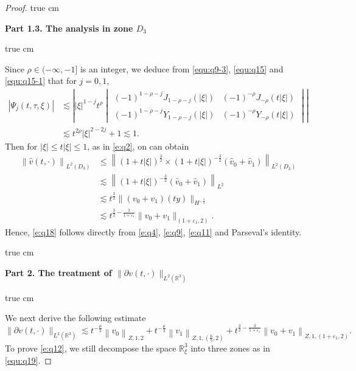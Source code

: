 \documentclass[10pt,a4paper]{amsart}
\newcommand{\R}{\mathbb R}
\newcommand{\f}{\frac}
\newcommand{\p}{\partial}
\begin{document}
\begin{proof}
 true cm

{\bf Part 1.3.  The analysis  in zone $D_3$}

 true cm

Since $\rho\in(-\infty,-1]$ is an integer, we deduce from \eqref{equ:q9-3}, \eqref{equ:q15} and \eqref{equ:q15-1} that for $j=0,1$,
\begin{equation}\label{e:q10}
\begin{aligned}
|\Psi_j(t,\tau,\xi)|
&\lesssim\left| |\xi|^{1-j} t^{\rho}
\begin{vmatrix}
(-1)^{1-\rho-j}J_{1-\rho-j}(|\xi|) & (-1)^{-\rho}J_{-\rho}(t|\xi|) \\
(-1)^{1-\rho-j}Y_{1-\rho-j}(|\xi|) & (-1)^{-\rho}Y_{-\rho}(t|\xi|)
\end{vmatrix} \right|\\
&\lesssim t^{2\rho}|\xi|^{2-2j}+1
\lesssim 1.
\end{aligned}
\end{equation}
Then for $|\xi|\leq t|\xi| \leq 1$, as in \eqref{e:q2}, on can obtain
\begin{equation}\label{e:q11}
\begin{aligned}
\left\|\hat{v}(t, \cdot)\right\|_{L^2(D_3)} & \leq\left\|(1+t|\xi|)^{\f32}\times(1+t|\xi|)^{-\f32}(\hat{v}_{0}+\hat{v}_{1})\right\|_{L^{2}(D_3)} \\
&\lesssim\left\|(1+t|\xi|)^{-\f32}(\hat{v}_{0}+\hat{v}_{1})\right\|_{L^{2}}\\
& \lesssim t^{\f32}\|(v_0+v_1)(ty)\|_{H^{-\f32}}\\
&\lesssim t^{\f32-\f{3}{1+\varepsilon_1}}\|v_0+v_1\|_{(1+\varepsilon_1, 2)}.
\end{aligned}
\end{equation}
Hence, \eqref{e:q18} follows directly from \eqref{e:q4}, \eqref{e:q9}, \eqref{e:q11} and Parseval's identity.

 true cm

{\bf Part 2.  The treatment  of $\|\p v(t, \cdot)\|_{L^2(\R^3)}$ }

 true cm

We next derive the following estimate
\begin{equation}\label{e:q12}
\|\p v(t, \cdot)\|_{L^2(\R^3)} \lesssim t^{-\f{\mu}{2}}\left\|v_0\right\|_{Z, 1, 2}+t^{-\f{\mu}{2}}\left\|v_1\right\|_{Z, 1,(\f65, 2)}+t^{\f32-\f{3}{1+\varepsilon_1}}\left\|v_0+v_1\right\|_{Z, 1,(1+\varepsilon_1, 2)}.
\end{equation}
To prove \eqref{e:q12}, we still
decompose the space $\R_{\xi}^3$ into three zones as in \eqref{equ:q19}.


\end{proof}
\end{document}
